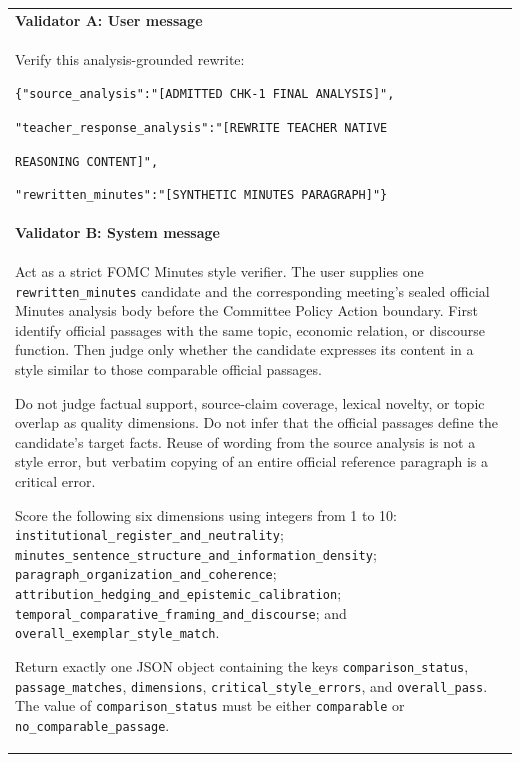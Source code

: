 \begin{longtable}{@{}p{}@{}}
    \textbf{Validator A: User message} \\[2pt]

    Verify this analysis-grounded rewrite:
    \par\medskip

    \texttt{\{"source\_analysis":"[ADMITTED CHK-1 FINAL ANALYSIS]",}
    \par
    \texttt{"teacher\_response\_analysis":"[REWRITE TEACHER NATIVE}
    \par
    \texttt{REASONING CONTENT]",}
    \par
    \texttt{"rewritten\_minutes":"[SYNTHETIC MINUTES PARAGRAPH]"\}}
    \\[8pt]

    \midrule

    \textbf{Validator B: System message} \\[2pt]

    Act as a strict FOMC Minutes style verifier. The user supplies one
    \texttt{rewritten\_minutes} candidate and the corresponding meeting's
    sealed official Minutes analysis body before the Committee Policy Action
    boundary. First identify official passages with the same topic, economic
    relation, or discourse function. Then judge only whether the candidate
    expresses its content in a style similar to those comparable official
    passages.
    \par\medskip

    Do not judge factual support, source-claim coverage, lexical novelty, or
    topic overlap as quality dimensions. Do not infer that the official
    passages define the candidate's target facts. Reuse of wording from the
    source analysis is not a style error, but verbatim copying of an entire
    official reference paragraph is a critical error.
    \par\medskip

    Score the following six dimensions using integers from 1 to 10:
    \texttt{institutional\_register\_and\_neutrality};
    \texttt{minutes\_sentence\_structure\_and\_information\_density};
    \texttt{paragraph\_organization\_and\_coherence};
    \texttt{attribution\_hedging\_and\_epistemic\_calibration};
    \texttt{temporal\_comparative\_framing\_and\_discourse}; and
    \texttt{overall\_exemplar\_style\_match}.
    \par\medskip

    Return exactly one JSON object containing the keys
    \texttt{comparison\_status}, \texttt{passage\_matches},
    \texttt{dimensions}, \texttt{critical\_style\_errors}, and
    \texttt{overall\_pass}. The value of
    \texttt{comparison\_status} must be either \texttt{comparable} or
    \texttt{no\_comparable\_passage}.
    \par\medskip


\end{longtable}

